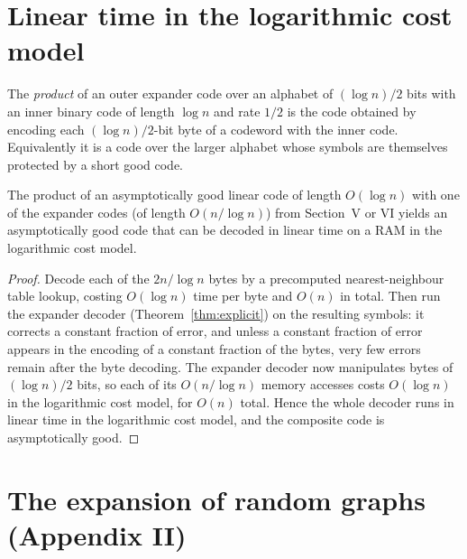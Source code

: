 \chapter{Linear time in the logarithmic cost model}


\begin{definition}
  \label{def:product-code}
  The \emph{product} of an outer expander code over an alphabet of
  $(\log n)/2$ bits with an inner binary code of length $\log n$ and rate $1/2$
  is the code obtained by encoding each $(\log n)/2$-bit byte of a codeword with
  the inner code. Equivalently it is a code over the larger alphabet whose
  symbols are themselves protected by a short good code.
\end{definition}

\begin{corollary}
  \label{cor:log-cost}
  The product of an asymptotically good linear code of length $O(\log n)$ with
  one of the expander codes (of length $O(n/\log n)$) from Section~V or VI
  yields an asymptotically good code that can be decoded in linear time on a RAM
  in the logarithmic cost model.
\end{corollary}
\begin{proof}
  Decode each of the $2n/\log n$ bytes by a precomputed nearest-neighbour table
  lookup, costing $O(\log n)$ time per byte and $O(n)$ in total. Then run the
  expander decoder (Theorem~\ref{thm:explicit}) on the resulting symbols: it
  corrects a constant fraction of error, and unless a constant fraction of error
  appears in the encoding of a constant fraction of the bytes, very few errors
  remain after the byte decoding. The expander decoder now manipulates bytes of
  $(\log n)/2$ bits, so each of its $O(n/\log n)$ memory accesses costs
  $O(\log n)$ in the logarithmic cost model, for $O(n)$ total. Hence the whole
  decoder runs in linear time in the logarithmic cost model, and the composite
  code is asymptotically good.
\end{proof}

\chapter{The expansion of random graphs (Appendix II)}

